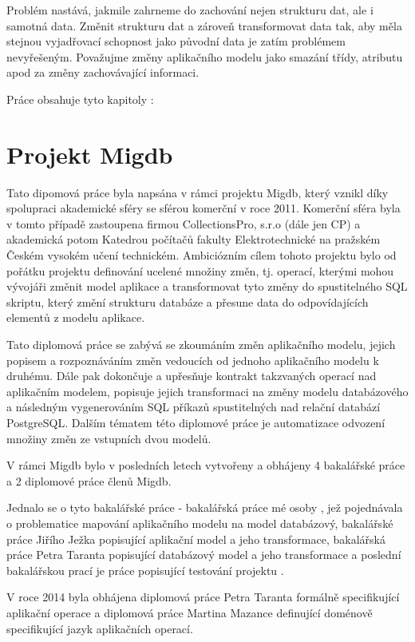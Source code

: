 \documentclass[11pt,twoside,a4paper]{book}
\begin{document}
Problém nastává, jakmile zahrneme do zachování nejen strukturu dat, ale i
samotná data. Změnit strukturu dat a zároveň transformovat data tak, aby měla
stejnou vyjadřovací schopnost jako původní data je zatím problémem nevyřešeným.
Považujme změny aplikačního modelu jako smazání třídy, atributu apod za změny
zachovávající informaci.

Práce obsahuje tyto kapitoly :


\chapter{Projekt Migdb}

Tato dipomová práce byla napsána v rámci projektu Migdb, který vznikl díky
spolupraci akademické sféry se sférou komerční v roce 2011. Komerční sféra byla
v tomto případě zastoupena firmou CollectionsPro, s.r.o (dále jen CP) a
akademická potom Katedrou počítačů fakulty Elektrotechnické na pražském
Českém vysokém učení technickém. Ambiciózním cílem tohoto projektu bylo od
pořátku projektu definování ucelené množiny změn, tj. operací, kterými mohou
vývojáři změnit model aplikace a transformovat tyto změny do spustitelného SQL
skriptu, který změní strukturu databáze a přesune data do odpovídajících
elementů z modelu aplikace.

Tato diplomová práce se zabývá se zkoumáním změn aplikačního modelu, jejich
popisem a rozpoznáváním změn vedoucích od jednoho aplikačního modelu
k druhému. Dále pak dokončuje a upřesňuje kontrakt takzvaných operací nad
aplikačním modelem, popisuje jejich transformaci na změny modelu databázového
a následným vygenerováním SQL příkazů spustitelných nad relační databází
PostgreSQL. Dalším tématem této diplomové práce je automatizace odvození množiny
změn ze vstupních dvou modelů.

V rámci Migdb bylo v posledních letech vytvořeny a obhájeny 4 bakalářské práce a
2 diplomové práce členů Migdb.

Jednalo se o tyto bakalářské práce - bakalářská práce mé osoby \cite{Lukes},
jež pojednávala o problematice mapování aplikačního modelu na model databázový,
bakalářské práce Jiřího Ježka \cite{Jezek} popisující aplikační model a jeho
transformace, bakalářská práce Petra Taranta \cite{Tarant_bp} popisující
databázový model a jeho transformace a poslední bakalářskou prací je práce
popisující testování projektu \cite{Luksch}.

V roce 2014 byla obhájena diplomová práce Petra Taranta \cite{Tarant_dip}
formálně specifikující aplikační operace a diplomová práce Martina Mazance
\cite{Mazanec} definující doménově specifikující jazyk aplikačních operací.
\end{document}
